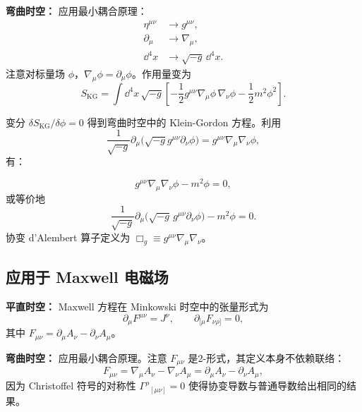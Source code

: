\textbf{弯曲时空：} 应用最小耦合原理：
\begin{align}
    \eta^{\mu\nu} &\to g^{\mu\nu}, \\
    \partial_\mu &\to \nabla_\mu, \\
    \dd^4 x &\to \sqrt{-g}\,\dd^4 x.
\end{align}
注意对标量场 $\phi$，$\nabla_\mu\phi = \partial_\mu\phi$。作用量变为
\begin{equation}
    S_{\text{KG}} = \int \dd^4 x \, \sqrt{-g} \left[ -\frac{1}{2} g^{\mu\nu} \nabla_\mu\phi \,\nabla_\nu\phi - \frac{1}{2} m^2 \phi^2 \right].
\end{equation}

变分 $\delta S_{\text{KG}} / \delta\phi = 0$ 得到弯曲时空中的 Klein-Gordon 方程。利用
\begin{equation}
    \frac{1}{\sqrt{-g}} \partial_\mu\bigl(\sqrt{-g} g^{\mu\nu} \partial_\nu\phi\bigr) = g^{\mu\nu}\nabla_\mu\nabla_\nu\phi,
\end{equation}
有：
\begin{theorem}
\begin{equation}
    \boxed{g^{\mu\nu}\nabla_\mu\nabla_\nu \phi - m^2\phi = 0},
\end{equation}
或等价地
\begin{equation}
    \boxed{\frac{1}{\sqrt{-g}} \partial_\mu\bigl(\sqrt{-g}\, g^{\mu\nu} \partial_\nu\phi\bigr) - m^2\phi = 0}.
\end{equation}
协变 d'Alembert 算子定义为 $\Box_g \equiv g^{\mu\nu}\nabla_\mu\nabla_\nu$。
\end{theorem}

\subsection{应用于 Maxwell 电磁场}

\textbf{平直时空：} Maxwell 方程在 Minkowski 时空中的张量形式为
\begin{equation}
    \partial_\mu F^{\mu\nu} = J^\nu, \qquad 
    \partial_{[\mu}F_{\nu\rho]} = 0,
\end{equation}
其中 $F_{\mu\nu} = \partial_\mu A_\nu - \partial_\nu A_\mu$。

\textbf{弯曲时空：} 应用最小耦合原理。注意 $F_{\mu\nu}$ 是2-形式，其定义本身不依赖联络：
\begin{equation}
    F_{\mu\nu} = \nabla_\mu A_\nu - \nabla_\nu A_\mu = \partial_\mu A_\nu - \partial_\nu A_\mu,
\end{equation}
因为 Christoffel 符号的对称性 $\Gamma^\rho{}_{[\mu\nu]} = 0$ 使得协变导数与普通导数给出相同的结果。

